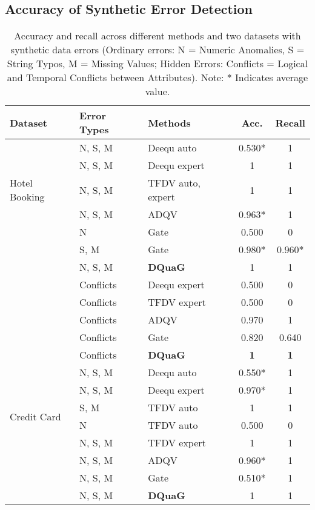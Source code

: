 \subsection{Accuracy of Synthetic Error Detection}
\begin{table}[tb]
\centering
\caption{Accuracy and recall across different methods and two datasets with synthetic data errors (Ordinary errors: N = Numeric Anomalies, S = String Typos, M = Missing Values; Hidden Errors: Conflicts = Logical and Temporal Conflicts between Attributes). \small{Note: * Indicates average value.}}
\label{table:consolidated_validation}
\footnotesize %
\begin{tabular}{lllcc}
\hline
\textbf{Dataset} & \textbf{Error Types} & \textbf{Methods} & \textbf{Acc.} & \textbf{Recall} \\
\hline
\multirow{5}{*}{Hotel Booking} 
 & N, S, M & Deequ auto & 0.530* & 1 \\
 & N, S, M & Deequ expert & 1 & 1 \\
 & N, S, M & TFDV auto, expert & 1 & 1 \\
 & N, S, M & ADQV & 0.963* & 1 \\
 & N & Gate & 0.500 & 0 \\
  & S, M & Gate & 0.980* & 0.960* \\
 & N, S, M & \textbf{DQuaG} & 1  & 1 \\
\cline{2-5}
 & Conflicts & Deequ expert & 0.500 & 0 \\
 & Conflicts & TFDV expert & 0.500 & 0 \\
& Conflicts &  ADQV & 0.970 & 1 \\
& Conflicts &  Gate & 0.820 & 0.640 \\
 & Conflicts & \textbf{DQuaG} &  \textbf{1} & \textbf{1} \\
\hline
\multirow{6}{*}{Credit Card} 
 & N, S, M & Deequ auto & 0.550* & 1 \\
 & N, S, M & Deequ expert & 0.970* & 1 \\
 & S, M & TFDV auto & 1 & 1 \\
 & N  & TFDV auto &  0.500 & 0 \\
 & N, S, M & TFDV expert &  1 & 1 \\
 & N, S, M  & ADQV & 0.960* & 1 \\
 & N, S, M  & Gate & 0.510* & 1 \\
 & N, S, M  & \textbf{DQuaG} & 1 & 1 \\

\end{tabular}
\end{table}
